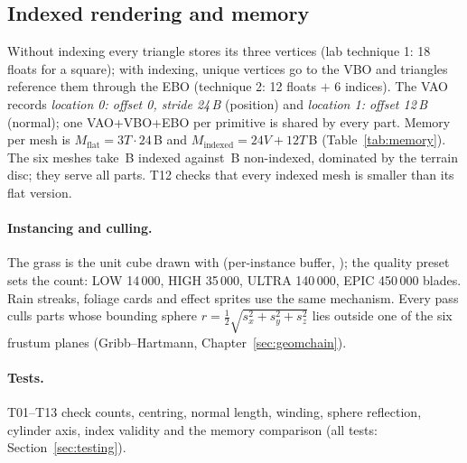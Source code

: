 \subsection{Indexed rendering and memory}
Without indexing every triangle stores its three vertices (lab technique 1: 18 floats for a square); with
indexing, unique vertices go to the VBO and triangles reference them through the EBO (technique 2: 12 floats $+$ 6
indices). The VAO records \emph{location 0: offset 0, stride 24\,B} (position) and \emph{location 1: offset 12\,B}
(normal); one VAO+VBO+EBO per primitive is shared by every part. Memory per mesh is
$M_\text{flat}=3T\cdot 24$\,B and $M_\text{indexed}=24V+12T$\,B (Table~\ref{tab:memory}). The six meshes take \memIndexed\,B indexed against \memNonIndexed\,B non-indexed, dominated by the
terrain disc; they serve all \nLeaves{} parts. T12 checks that every indexed mesh is smaller than its flat version.

\begin{table}[h]
\centering\small
\caption{GPU meshes (from ). The terrain's vertex count (49\,921) is that of the 36\,m mesh (T13).}
\label{tab:memory}

\end{table}

\begin{figure}[h]
\centering
{}
\caption{}
\end{figure}
\paragraph{Instancing and culling.} The grass is the unit cube drawn with  (per-instance buffer, ); the quality preset sets the count: LOW 14\,000, HIGH 35\,000,
ULTRA 140\,000, EPIC 450\,000 blades. Rain streaks, foliage cards and effect sprites use the same mechanism. Every pass culls parts whose bounding sphere $r=\tfrac12\sqrt{s_x^2+s_y^2+s_z^2}$ lies outside one of the six
frustum planes (Gribb--Hartmann, Chapter~\ref{sec:geomchain}).

\paragraph{Tests.} T01--T13 check counts, centring, normal length, winding, sphere reflection, cylinder
axis, index validity and the memory comparison (all \nTests{} tests: Section~\ref{sec:testing}).
